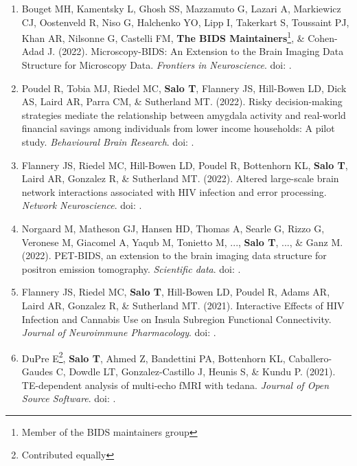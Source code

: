 \documentclass[10pt]{article}
\newcommand{\doi}[1]{doi: \textlink{https://doi.org/#1}{#1}}
\newcommand{\textlink}[3][blue]{\href{#2}{\color{#1}{#3}}}
\begin{document}
\begin{enumerate}

	\item Bouget MH, Kamentsky L, Ghosh SS, Mazzamuto G, Lazari A, Markiewicz CJ, Oostenveld R, Niso G, Halchenko YO, Lipp I, Takerkart S, Toussaint PJ, Khan AR, Nilsonne G, Castelli FM, \textbf{The BIDS Maintainers}\footnote{Member of the BIDS maintainers group}, \& Cohen-Adad J.
	(2022).
	Microscopy-BIDS: An Extension to the Brain Imaging Data Structure for Microscopy Data.
	\emph{Frontiers in Neuroscience}.
	\doi{10.3389/fnins.2022.871228}.

	\item Poudel R, Tobia MJ, Riedel MC, \textbf{Salo T}, Flannery JS, Hill-Bowen LD, Dick AS, Laird AR, Parra CM, \& Sutherland MT.
	(2022).
	Risky decision-making strategies mediate the relationship between amygdala activity and real-world financial savings among individuals from lower income households: A pilot study.
	\emph{Behavioural Brain Research}.
	\doi{10.1016/j.bbr.2022.113867}.

	\item Flannery JS, Riedel MC, Hill-Bowen LD, Poudel R, Bottenhorn KL, \textbf{Salo T}, Laird AR, Gonzalez R, \& Sutherland MT.
	(2022).
	Altered large-scale brain network interactions associated with HIV infection and error processing.
	\emph{Network Neuroscience}.
	\doi{10.1162/netn\_a\_00241}.

	\item Norgaard M, Matheson GJ, Hansen HD, Thomas A, Searle G, Rizzo G, Veronese M, Giacomel A, Yaqub M, Tonietto M, ..., \textbf{Salo T}, ..., \& Ganz M.
	(2022).
	PET-BIDS, an extension to the brain imaging data structure for positron emission tomography.
	\emph{Scientific data}.
	\doi{10.1038/s41597-022-01164-1}.

	\item Flannery JS, Riedel MC, \textbf{Salo T}, Hill-Bowen LD, Poudel R, Adams AR, Laird AR, Gonzalez R, \& Sutherland MT.
	(2021).
	Interactive Effects of HIV Infection and Cannabis Use on Insula Subregion Functional Connectivity.
	\emph{Journal of Neuroimmune Pharmacology}.
	\doi{10.1007/s11481-021-10005-8}.

	\item DuPre E\footnote{\label{note1}Contributed equally}, \textbf{Salo T}, Ahmed Z, Bandettini PA, Bottenhorn KL, Caballero-Gaudes C, Dowdle LT, Gonzalez-Castillo J, Heunis S, \& Kundu P.
	(2021).
	TE-dependent analysis of multi-echo fMRI with tedana.
	\emph{Journal of Open Source Software}.
	\doi{10.21105/joss.03669}.


\end{enumerate}
\end{document}
